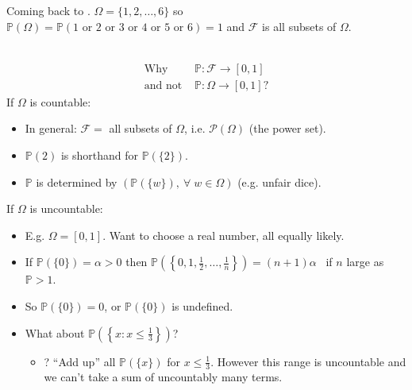 \begin{example}
    Coming back to .
    $\Omega=\{1,2,\dots,6\}$ so \\
    $\mathbb{P}(\Omega) = \mathbb{P}(\text{1 or 2 or 3 or 4 or 5 or 6}) = 1$ and $\mathcal{F}$ is all subsets of $\Omega$.
\end{example}

\begin{question} ~\vspace*{-1.5\baselineskip}
    \begin{align*}
        \text{Why } &\mathbb{P} : \mathcal{F} \to [0, 1] \\
        \text{and not } &\mathbb{P} : \Omega \to [0, 1]?
    \end{align*}
    If $\Omega$ is countable:
    \begin{itemize}
        \item In general: $\mathcal{F} =$ all subsets of $\Omega$, i.e. $\mathcal{P}(\Omega)$ (the power set).
        \item $\mathbb{P}(2)$ is shorthand for $\mathbb{P}(\{2\})$.
        \item $\mathbb{P}$ is determined by $\left(\mathbb{P}(\{w\}),\ \forall \; w \in \Omega \right)$ (e.g. unfair dice).
    \end{itemize}

    If $\Omega$ is uncountable:
    \begin{itemize}
        \item E.g. $\Omega = [0, 1]$.
        Want to choose a real number, all equally likely.
        \item If $\mathbb{P}\left(\{0\}\right) = \alpha > 0$ then $\mathbb{P}\left(\left\{0, 1, \frac{1}{2}, \dots, \frac{1}{n}\right\}\right) = (n + 1)\alpha$ \Lightning \ if $n$ large as $\mathbb{P} > 1$.
        \item So $\mathbb{P}(\{0\}) = 0$, or $\mathbb{P}(\{0\})$ is undefined.
        \item What about $\mathbb{P}\left(\left\{x : x \leq \frac{1}{3}\right\}\right)$?
        \begin{itemize}
            \item ? ``Add up'' all $\mathbb{P}(\{x\})$ for $x \leq \frac{1}{3}$. However this range is uncountable and we can't take a sum of uncountably many terms.
        \end{itemize}
    \end{itemize}
\end{question}


